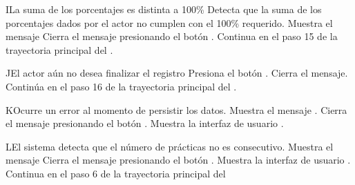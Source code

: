 
\begin{UCtrayectoriaA}{I}{La suma de los porcentajes es distinta a 100\%}
    \UCpaso Detecta que la suma de los porcentajes dados por el actor no cumplen con el 100\% requerido.
    \UCpaso Muestra el mensaje 
    \UCpaso[\UCactor] Cierra el mensaje presionando el botón .
    \UCpaso Continua en el paso 15 de la trayectoria principal del .
\end{UCtrayectoriaA}


\begin{UCtrayectoriaA}{J}{El actor aún no desea finalizar el registro}
	\UCpaso[\UCactor] Presiona el botón .
	\UCpaso Cierra el mensaje.
	\UCpaso Continúa en el paso 16 de la trayectoria principal del .
\end{UCtrayectoriaA}


\begin{UCtrayectoriaA}{K}{Ocurre un error al momento de persistir los datos.}
	\UCpaso Muestra el mensaje .
	\UCpaso[\UCactor] Cierra el mensaje presionando el botón .
	\UCpaso Muestra la interfaz de usuario .
\end{UCtrayectoriaA}


\begin{UCtrayectoriaA}{L}{El sistema detecta que el número de prácticas no es consecutivo.}
	\UCpaso Muestra el mensaje 
	\UCpaso[\UCactor] Cierra el mensaje presionando el botón .
	\UCpaso Muestra la interfaz de usuario .
	\UCpaso Continua en el paso 6 de la trayectoria principal del 
\end{UCtrayectoriaA}